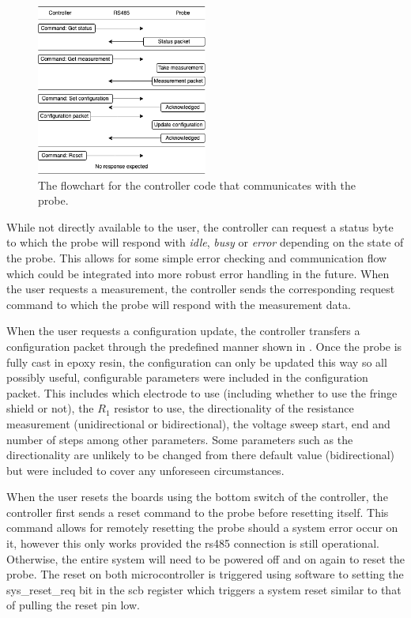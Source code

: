 \begin{figure}[ht]
    \centering
    \includegraphics[width=0.5\textwidth]{Figures/rs485_flowchart}
    \caption{The flowchart for the controller code that communicates with the probe.}
    \label{fig:rs485-flowchart} %
\end{figure}

While not directly available to the user, the controller can request a status byte to which the probe will respond with \textit{idle}, \textit{busy} or \textit{error} depending on the state of the probe.
This allows for some simple error checking and communication flow which could be integrated into more robust error handling in the future.
When the user requests a measurement, the controller sends the corresponding request command to which the probe will respond with the measurement data.

When the user requests a configuration update, the controller transfers a configuration packet through the predefined manner shown in .
Once the probe is fully cast in epoxy resin, the configuration can only be updated this way so all possibly useful, configurable parameters were included in the configuration packet.
This includes which electrode to use (including whether to use the fringe shield or not), the $R_1$ resistor to use, the directionality of the resistance measurement (unidirectional or bidirectional), the voltage sweep start, end and number of steps among other parameters.
Some parameters such as the directionality are unlikely to be changed from there default value (bidirectional) but were included to cover any unforeseen circumstances.

When the user resets the boards using the bottom switch of the controller, the controller first sends a reset command to the probe before resetting itself.
This command allows for remotely resetting the probe should a system error occur on it, however this only works provided the \gls{rs485} connection is still operational.
Otherwise, the entire system will need to be powered off and on again to reset the probe.
The reset on both microcontroller is triggered using software to setting the \gls{sys_reset_req} bit in the \gls{scb} register which triggers a system reset similar to that of pulling the reset pin low.
